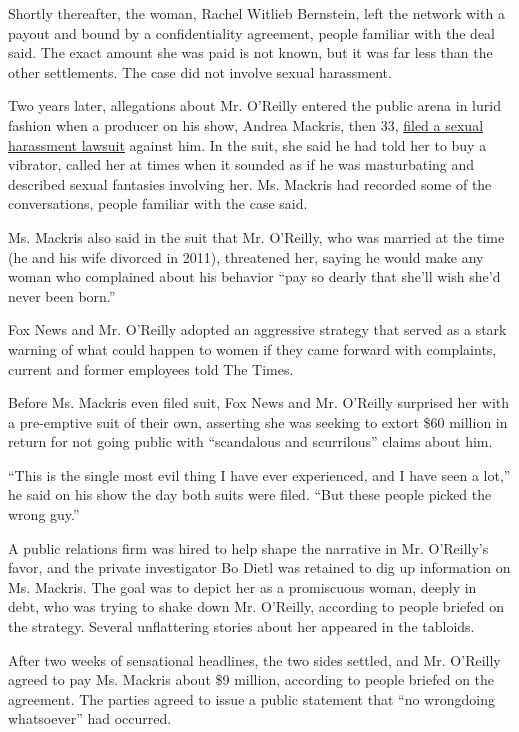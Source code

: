 Shortly thereafter, the woman, Rachel Witlieb Bernstein, left the
network with a payout and bound by a confidentiality agreement, people
familiar with the deal said. The exact amount she was paid is not known,
but it was far less than the other settlements. The case did not involve
sexual harassment.

Two years later, allegations about Mr. O'Reilly entered the public arena
in lurid fashion when a producer on his show, Andrea Mackris, then 33,
\href{http://www.nytimes3xbfgragh.onion/2004/10/14/business/media/accused-of-harassment-fox-star-sues-and-is-sued.html}{filed
a sexual harassment lawsuit} against him. In the suit, she said he had
told her to buy a vibrator, called her at times when it sounded as if he
was masturbating and described sexual fantasies involving her. Ms.
Mackris had recorded some of the conversations, people familiar with the
case said.

Ms. Mackris also said in the suit that Mr. O'Reilly, who was married at
the time (he and his wife divorced in 2011), threatened her, saying he
would make any woman who complained about his behavior ``pay so dearly
that she'll wish she'd never been born.''

Fox News and Mr. O'Reilly adopted an aggressive strategy that served as
a stark warning of what could happen to women if they came forward with
complaints, current and former employees told The Times.

Before Ms. Mackris even filed suit, Fox News and Mr. O'Reilly surprised
her with a pre-emptive suit of their own, asserting she was seeking to
extort \$60 million in return for not going public with ``scandalous and
scurrilous'' claims about him.

``This is the single most evil thing I have ever experienced, and I have
seen a lot,'' he said on his show the day both suits were filed. ``But
these people picked the wrong guy.''

A public relations firm was hired to help shape the narrative in Mr.
O'Reilly's favor, and the private investigator Bo Dietl was retained to
dig up information on Ms. Mackris. The goal was to depict her as a
promiscuous woman, deeply in debt, who was trying to shake down Mr.
O'Reilly, according to people briefed on the strategy. Several
unflattering stories about her appeared in the tabloids.

After two weeks of sensational headlines, the two sides settled, and Mr.
O'Reilly agreed to pay Ms. Mackris about \$9 million, according to
people briefed on the agreement. The parties agreed to issue a public
statement that ``no wrongdoing whatsoever'' had occurred.

